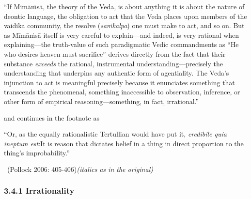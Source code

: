\begin{myquote}
“If Mīmāṁsā, the theory of the Veda, is about anything it is about the nature of deontic language, the obligation to act that the Veda places upon members of the vaidika community, the resolve (\textit{saṁkalpa}) one must make to act, and so on. But as Mīmāṁsā itself is very careful to explain—and indeed, is very rational when explaining—the truth-value of such paradigmatic Vedic commandments as “He who desires heaven must sacrifice” derives directly from the fact that their substance \textit{exceeds} the rational, instrumental understanding—precisely the understanding that underpins any authentic form of agentiality. The Veda’s injunction to act is meaningful precisely because it enunciates something that transcends the phenomenal, something inaccessible to observation, inference, or other form of empirical reasoning—something, in fact, irrational.”
\end{myquote}

and continues in the footnote as

\begin{myquote}
“Or, as the equally rationalistic Tertullian would have put it, \textit{credibile quia ineptum est}:It is reason that dictates belief in a thing in direct proportion to the thing’s improbability.” 

~\hfill (Pollock 2006: 405-406)\textit{(italics as in the original)}
\end{myquote}


\subsubsection*{3.4.1 Irrationality}

